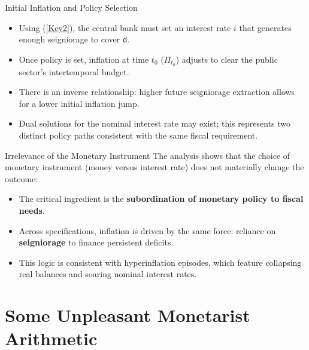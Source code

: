 \documentclass[11pt,aspectratio=169]{beamer}
\begin{document}
\begin{frame}{Initial Inflation and Policy Selection}
\small

\begin{itemize}
    \item Using (\ref{Key2}), the central bank must set an interest rate $i$ that generates enough seigniorage to cover $\mathsf{d}$.
    \item Once policy is set, inflation at time $t_0$ ($\Pi_{t_0}$) adjusts to clear the public sector's intertemporal budget.
    \item There is an inverse relationship: higher future seigniorage extraction allows for a lower initial inflation jump.
    \item Dual solutions for the nominal interest rate may exist; this represents two distinct policy paths consistent with the same fiscal requirement.
\end{itemize}
\end{frame}

\begin{frame}{Irrelevance of the Monetary Instrument}
\small
The analysis shows that the choice of monetary instrument (money versus interest rate) does not materially change the outcome:

\begin{itemize}
    \item The critical ingredient is the \textbf{subordination of monetary policy to fiscal needs}.
    \item Across specifications, inflation is driven by the same force: reliance on \textbf{seigniorage} to finance persistent deficits.
    \item This logic is consistent with hyperinflation episodes, which feature collapsing real balances and soaring nominal interest rates.
\end{itemize}
\end{frame}



\section{Some Unpleasant Monetarist Arithmetic}
\end{document}

